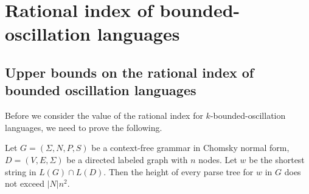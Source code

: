 \section{Rational index of bounded-oscillation languages}
\label{sec:osc}
\subsection{Upper bounds on the rational index of bounded oscillation languages}
Before we consider the value of the rational index for $k$-bounded-oscillation languages, we need to prove the following.
\begin{lemma}
\label{lem:treeheight}
Let  $G = (\Sigma, N, P, S)$ be a context-free grammar in Chomsky normal form,  $D=(V, E, \Sigma)$ be a directed labeled graph with $n$ nodes. Let $w$ be the shortest string in $L(G)\cap L(D)$. Then the height of every parse tree for $w$ in $G$ does not exceed $|N|n^2$.
\end{lemma}

